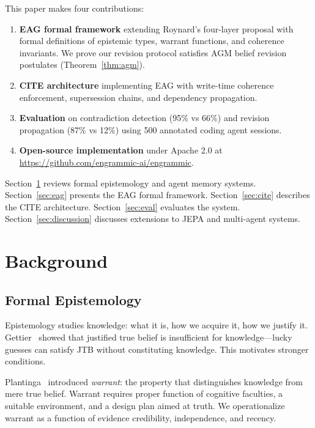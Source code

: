 \documentclass[11pt,a4paper]{article}
\begin{document}
This paper makes four contributions:
\begin{enumerate}[noitemsep]
    \item \textbf{EAG formal framework} extending Roynard's four-layer proposal with formal definitions of epistemic types, warrant functions, and coherence invariants. We prove our revision protocol satisfies AGM belief revision postulates (Theorem~\ref{thm:agm}).
    \item \textbf{CITE architecture} implementing EAG with write-time coherence enforcement, supersession chains, and dependency propagation.
    \item \textbf{Evaluation} on contradiction detection (95\% vs 66\%) and revision propagation (87\% vs 12\%) using 500 annotated coding agent sessions.
    \item \textbf{Open-source implementation} under Apache 2.0 at \url{https://github.com/engrammic-ai/engrammic}.
\end{enumerate}

Section~\ref{sec:background} reviews formal epistemology and agent memory systems. Section~\ref{sec:eag} presents the EAG formal framework. Section~\ref{sec:cite} describes the CITE architecture. Section~\ref{sec:eval} evaluates the system. Section~\ref{sec:discussion} discusses extensions to JEPA and multi-agent systems.

\section{Background}
\label{sec:background}

\subsection{Formal Epistemology}

Epistemology studies knowledge: what it is, how we acquire it, how we justify it. Gettier~\cite{gettier1963} showed that justified true belief is insufficient for knowledge---lucky guesses can satisfy JTB without constituting knowledge. This motivates stronger conditions.

Plantinga~\cite{plantinga1993} introduced \textit{warrant}: the property that distinguishes knowledge from mere true belief. Warrant requires proper function of cognitive faculties, a suitable environment, and a design plan aimed at truth. We operationalize warrant as a function of evidence credibility, independence, and recency.
\end{document}
